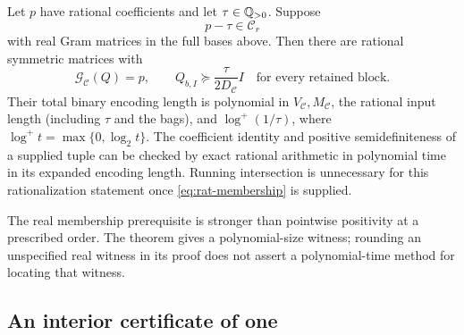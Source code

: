\begin{theorem}\label{thm:rational}
Let $p$ have rational coefficients and let $\tau\in\mathbb{Q}_{>0}$. Suppose
\begin{equation}\label{eq:rat-membership}
 p-\tau\in\mathcal C_r
\end{equation}
with real Gram matrices in the full bases above. Then there are rational
symmetric matrices with
\begin{equation}\label{eq:rat-certificate}
 \mathcal G_{\mathcal C}(Q)=p,\qquad
 Q_{b,I}\succeq\frac{\tau}{2D_{\mathcal C}}I
 \quad\text{for every retained block}.
\end{equation}
Their total binary encoding length is polynomial in
$V_{\mathcal C},M_{\mathcal C}$, the rational input length (including
$\tau$ and the bags), and $\log^+(1/\tau)$, where
$\log^+t=\max\{0,\log_2t\}$. The coefficient identity and positive
semidefiniteness of a supplied tuple can be checked by exact rational
arithmetic in polynomial time in its expanded encoding length.
Running intersection is unnecessary for this rationalization statement
once \eqref{eq:rat-membership} is supplied.
\end{theorem}

The real membership prerequisite is stronger than pointwise positivity at
a prescribed order. The theorem gives a polynomial-size witness; rounding
an unspecified real witness in its proof does not assert a polynomial-time
method for locating that witness.

\subsection{An interior certificate of one}\label{sec:rat-interior}

